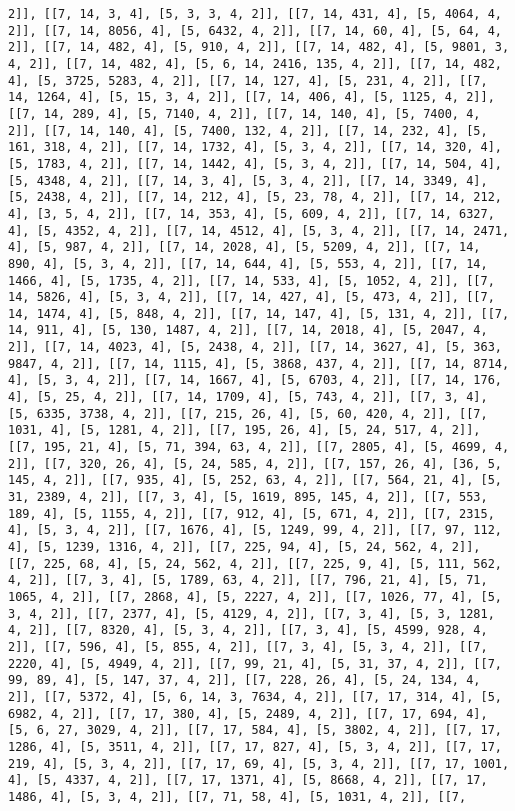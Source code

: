 \documentclass[12pt,fleqn]{article}\usepackage{../../common}
\begin{document}
\begin{verbatim}
2]], [[7, 14, 3, 4], [5, 3, 3, 4, 2]], [[7, 14, 431, 4], [5, 4064, 4, 2]], [[7, 14, 8056, 4], [5, 6432, 4, 2]], [[7, 14, 60, 4], [5, 64, 4, 2]], [[7, 14, 482, 4], [5, 910, 4, 2]], [[7, 14, 482, 4], [5, 9801, 3, 4, 2]], [[7, 14, 482, 4], [5, 6, 14, 2416, 135, 4, 2]], [[7, 14, 482, 4], [5, 3725, 5283, 4, 2]], [[7, 14, 127, 4], [5, 231, 4, 2]], [[7, 14, 1264, 4], [5, 15, 3, 4, 2]], [[7, 14, 406, 4], [5, 1125, 4, 2]], [[7, 14, 289, 4], [5, 7140, 4, 2]], [[7, 14, 140, 4], [5, 7400, 4, 2]], [[7, 14, 140, 4], [5, 7400, 132, 4, 2]], [[7, 14, 232, 4], [5, 161, 318, 4, 2]], [[7, 14, 1732, 4], [5, 3, 4, 2]], [[7, 14, 320, 4], [5, 1783, 4, 2]], [[7, 14, 1442, 4], [5, 3, 4, 2]], [[7, 14, 504, 4], [5, 4348, 4, 2]], [[7, 14, 3, 4], [5, 3, 4, 2]], [[7, 14, 3349, 4], [5, 2438, 4, 2]], [[7, 14, 212, 4], [5, 23, 78, 4, 2]], [[7, 14, 212, 4], [3, 5, 4, 2]], [[7, 14, 353, 4], [5, 609, 4, 2]], [[7, 14, 6327, 4], [5, 4352, 4, 2]], [[7, 14, 4512, 4], [5, 3, 4, 2]], [[7, 14, 2471, 4], [5, 987, 4, 2]], [[7, 14, 2028, 4], [5, 5209, 4, 2]], [[7, 14, 890, 4], [5, 3, 4, 2]], [[7, 14, 644, 4], [5, 553, 4, 2]], [[7, 14, 1466, 4], [5, 1735, 4, 2]], [[7, 14, 533, 4], [5, 1052, 4, 2]], [[7, 14, 5826, 4], [5, 3, 4, 2]], [[7, 14, 427, 4], [5, 473, 4, 2]], [[7, 14, 1474, 4], [5, 848, 4, 2]], [[7, 14, 147, 4], [5, 131, 4, 2]], [[7, 14, 911, 4], [5, 130, 1487, 4, 2]], [[7, 14, 2018, 4], [5, 2047, 4, 2]], [[7, 14, 4023, 4], [5, 2438, 4, 2]], [[7, 14, 3627, 4], [5, 363, 9847, 4, 2]], [[7, 14, 1115, 4], [5, 3868, 437, 4, 2]], [[7, 14, 8714, 4], [5, 3, 4, 2]], [[7, 14, 1667, 4], [5, 6703, 4, 2]], [[7, 14, 176, 4], [5, 25, 4, 2]], [[7, 14, 1709, 4], [5, 743, 4, 2]], [[7, 3, 4], [5, 6335, 3738, 4, 2]], [[7, 215, 26, 4], [5, 60, 420, 4, 2]], [[7, 1031, 4], [5, 1281, 4, 2]], [[7, 195, 26, 4], [5, 24, 517, 4, 2]], [[7, 195, 21, 4], [5, 71, 394, 63, 4, 2]], [[7, 2805, 4], [5, 4699, 4, 2]], [[7, 320, 26, 4], [5, 24, 585, 4, 2]], [[7, 157, 26, 4], [36, 5, 145, 4, 2]], [[7, 935, 4], [5, 252, 63, 4, 2]], [[7, 564, 21, 4], [5, 31, 2389, 4, 2]], [[7, 3, 4], [5, 1619, 895, 145, 4, 2]], [[7, 553, 189, 4], [5, 1155, 4, 2]], [[7, 912, 4], [5, 671, 4, 2]], [[7, 2315, 4], [5, 3, 4, 2]], [[7, 1676, 4], [5, 1249, 99, 4, 2]], [[7, 97, 112, 4], [5, 1239, 1316, 4, 2]], [[7, 225, 94, 4], [5, 24, 562, 4, 2]], [[7, 225, 68, 4], [5, 24, 562, 4, 2]], [[7, 225, 9, 4], [5, 111, 562, 4, 2]], [[7, 3, 4], [5, 1789, 63, 4, 2]], [[7, 796, 21, 4], [5, 71, 1065, 4, 2]], [[7, 2868, 4], [5, 2227, 4, 2]], [[7, 1026, 77, 4], [5, 3, 4, 2]], [[7, 2377, 4], [5, 4129, 4, 2]], [[7, 3, 4], [5, 3, 1281, 4, 2]], [[7, 8320, 4], [5, 3, 4, 2]], [[7, 3, 4], [5, 4599, 928, 4, 2]], [[7, 596, 4], [5, 855, 4, 2]], [[7, 3, 4], [5, 3, 4, 2]], [[7, 2220, 4], [5, 4949, 4, 2]], [[7, 99, 21, 4], [5, 31, 37, 4, 2]], [[7, 99, 89, 4], [5, 147, 37, 4, 2]], [[7, 228, 26, 4], [5, 24, 134, 4, 2]], [[7, 5372, 4], [5, 6, 14, 3, 7634, 4, 2]], [[7, 17, 314, 4], [5, 6982, 4, 2]], [[7, 17, 380, 4], [5, 2489, 4, 2]], [[7, 17, 694, 4], [5, 6, 27, 3029, 4, 2]], [[7, 17, 584, 4], [5, 3802, 4, 2]], [[7, 17, 1286, 4], [5, 3511, 4, 2]], [[7, 17, 827, 4], [5, 3, 4, 2]], [[7, 17, 219, 4], [5, 3, 4, 2]], [[7, 17, 69, 4], [5, 3, 4, 2]], [[7, 17, 1001, 4], [5, 4337, 4, 2]], [[7, 17, 1371, 4], [5, 8668, 4, 2]], [[7, 17, 1486, 4], [5, 3, 4, 2]], [[7, 71, 58, 4], [5, 1031, 4, 2]], [[7, 
\end{verbatim}
\end{document}

